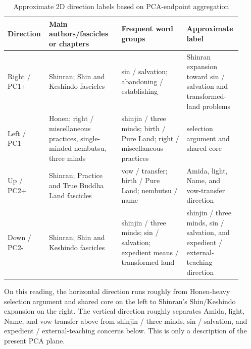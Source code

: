 \documentclass[uplatex,dvipdfmx,11pt,a4paper]{jsarticle}
\begin{document}
\begin{table}[H]
\centering
\footnotesize
\setlength{\tabcolsep}{2pt}
\caption{Approximate 2D direction labels based on PCA-endpoint aggregation}
\label{tab:pca-direction-reading}
\begin{tabular}{@{}p{0.15\linewidth}p{0.30\linewidth}p{0.27\linewidth}p{0.20\linewidth}@{}}
\toprule
Direction & Main authors/fascicles or chapters & Frequent word groups & Approximate label \\
\midrule
Right / PC1+ & Shinran; Shin and Keshindo fascicles & sin / salvation; abandoning / establishing & Shinran expansion toward sin / salvation and transformed-land problems \\
Left / PC1- & Honen; right / miscellaneous practices, single-minded nembutsu, three minds & shinjin / three minds; birth / Pure Land; right / miscellaneous practices & selection argument and shared core \\
Up / PC2+ & Shinran; Practice and True Buddha Land fascicles & vow / transfer; birth / Pure Land; nembutsu / name & Amida, light, Name, and vow-transfer direction \\
Down / PC2- & Shinran; Shin and Keshindo fascicles & shinjin / three minds; sin / salvation; expedient means / transformed land & shinjin / three minds, sin / salvation, and expedient / external-teaching direction \\
\bottomrule
\end{tabular}
\end{table}

On this reading, the horizontal direction runs roughly from Honen-heavy selection argument and shared core on the left to Shinran's Shin/Keshindo expansion on the right. The vertical direction roughly separates Amida, light, Name, and vow-transfer above from shinjin / three minds, sin / salvation, and expedient / external-teaching concerns below. This is only a description of the present PCA plane.
\end{document}
